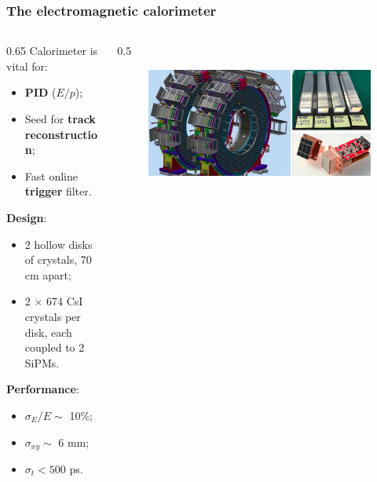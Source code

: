 \documentclass{beamer}
\begin{document}
\begin{frame}
    \frametitle{The electromagnetic calorimeter}
    \begin{columns}
            \begin{column}{0.65\framewidth}
      Calorimeter is vital for:
      \begin{itemize}
          \item \textbf{PID} ($E/p$);
          \item Seed for \textbf{track reconstruction};
          \item Fast online \textbf{trigger} filter.
      \end{itemize}
      \textbf{Design}:
      \begin{itemize}
        \item 2 hollow disks of crystals, 70 cm apart;
          \item 2 $\times$ 674 CsI crystals per disk, each coupled to 2 SiPMs.
      \end{itemize}
      \textbf{Performance}:
      \begin{itemize}
          \item $\sigma_E/E \sim$ 10\%;
          \item $\sigma_{xy}\sim$ 6 mm;
          \item $\sigma_t < 500$ ps.
      \end{itemize}
               \end{column}
        \begin{column}{0.5\framewidth}
            \begin{figure}[h]
            \centering
            \includegraphics[width=\columnwidth]{figures/png/Screenshot_20240322_121000.png}
        \end{figure}
              \begin{figure}[h]
            \centering

\end{figure}
\end{column}
\end{columns}
\end{frame}
\end{document}
